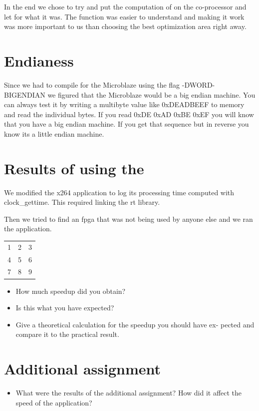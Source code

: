 \documentclass{article}
\begin{document}
In the end we chose to try and put the computation of \satd{} on the
co-processor and let \getref{} for what it was. The function \satd{} was easier
to understand and making it work was more important to us than choosing the
best optimization area right away.

\section{Endianess}

Since we had to compile for the Microblaze using the flag -DWORD-BIGENDIAN we
figured that the Microblaze would be a big endian machine. You can always test
it by writing a multibyte value like 0xDEADBEEF to memory and read the
individual bytes. If you read 0xDE 0xAD 0xBE 0xEF you will know that you have a
big endian machine. If you get that sequence but in reverse you know its a
little endian machine.

\section{Results of using the \rvex{}}

We modified the x264 application to log its processing time computed with
clock\_gettime. This required linking the rt library.

Then we tried to find an fpga that was not being used by anyone else and we ran
the application.

\begin{tabular}{ l c r }
  1 & 2 & 3 \\
  4 & 5 & 6 \\
  7 & 8 & 9 \\
\end{tabular}

\begin{itemize}
  \item How much speedup did you obtain?
  \item Is this what you have expected?
  \item Give a theoretical calculation for the speedup you should have ex-
        pected and compare it to the practical result.
\end{itemize}

\section{Additional assignment}

\begin{itemize}
  \item What were the results of the additional assignment? How did it affect
        the speed of the application?
\end{itemize}
\end{document}
